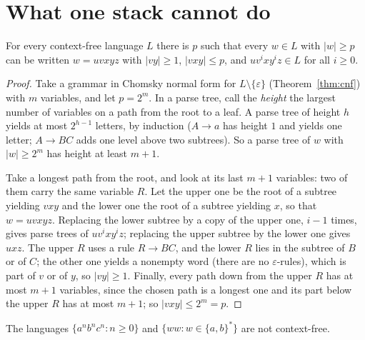 \section{What one stack cannot do}\label{sec:cflpumping}

\begin{lemma}\label{lem:cflpumping}
For every context-free language $L$ there is $p$ such that every $w\in L$ with $|w|\ge p$ can be written $w=uvxyz$ with $|vy|\ge1$, $|vxy|\le p$, and $uv^ixy^iz\in L$ for all $i\ge0$.
\end{lemma}

\begin{proof}
Take a grammar in Chomsky normal form for $L\setminus\{\varepsilon\}$ (Theorem~\ref{thm:cnf}) with $m$ variables, and let $p=2^m$. In a parse tree, call the \emph{height} the largest number of variables on a path from the root to a leaf. A parse tree of height $h$ yields at most $2^{h-1}$ letters, by induction ($A\to a$ has height $1$ and yields one letter; $A\to BC$ adds one level above two subtrees). So a parse tree of $w$ with $|w|\ge2^m$ has height at least $m+1$.

Take a longest path from the root, and look at its last $m+1$ variables: two of them carry the same variable $R$. Let the upper one be the root of a subtree yielding $vxy$ and the lower one the root of a subtree yielding $x$, so that $w=uvxyz$. Replacing the lower subtree by a copy of the upper one, $i-1$ times, gives parse trees of $uv^ixy^iz$; replacing the upper subtree by the lower one gives $uxz$. The upper $R$ uses a rule $R\to BC$, and the lower $R$ lies in the subtree of $B$ or of $C$; the other one yields a nonempty word (there are no $\varepsilon$-rules), which is part of $v$ or of $y$, so $|vy|\ge1$. Finally, every path down from the upper $R$ has at most $m+1$ variables, since the chosen path is a longest one and its part below the upper $R$ has at most $m+1$; so $|vxy|\le2^m=p$.
\end{proof}

\begin{proposition}\label{prop:noncf}
The languages $\{a^nb^nc^n:n\ge0\}$ and $\{ww:w\in\{a,b\}^*\}$ are not context-free.
\end{proposition}

